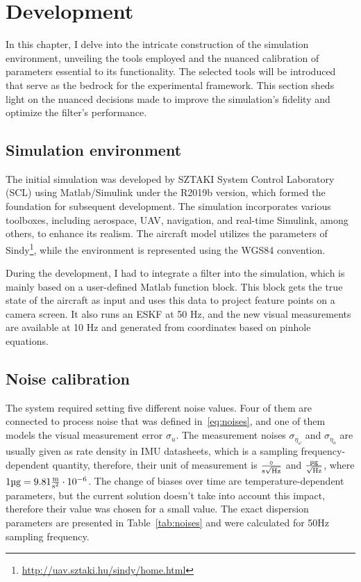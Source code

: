 \chapter{Development}\label{chap:dev}

In this chapter, I delve into the intricate construction of the simulation environment, unveiling the tools employed and the nuanced calibration of parameters essential to its functionality. The selected tools will be introduced that serve as the bedrock for the experimental framework. This section sheds light on the nuanced decisions made to improve the simulation's fidelity and optimize the filter's performance. 

\section{Simulation environment}

The initial simulation was developed by SZTAKI System Control Laboratory (SCL) using Matlab/Simulink under the R2019b version, which formed the foundation for subsequent development. The simulation incorporates various toolboxes, including aerospace, UAV, navigation, and real-time Simulink, among others, to enhance its realism. The aircraft model utilizes the parameters of Sindy\footnote{\url{http://uav.sztaki.hu/sindy/home.html}}, while the environment is represented using the WGS84 convention.

During the development, I had to integrate a filter into the simulation, which is mainly based on a user-defined Matlab function block. This block gets the true state of the aircraft as input and uses this data to project feature points on a camera screen. It also runs an ESKF at 50 \si{\hertz}, and the new visual measurements are available at 10 \si{\hertz} and generated from coordinates based on pinhole equations.

\section{Noise calibration}

The system required setting five different noise values. Four of them are connected to process noise that was defined in~\eqref{eq:noises}, and one of them models the visual measurement error $\sigma_u$. The measurement noises $\sigma_{\eta_\omega}$ and $\sigma_{\eta_a}$ are usually given as rate density in IMU datasheets, which is a sampling frequency-dependent quantity, therefore, their unit of measurement is $\si{\frac{\circ}{\second\sqrt{\hertz}}}$ and $\si{\frac{\micro g}{\sqrt{\hertz}}}$, where $1\si{\micro g}=9.81\si{\frac{\meter}{\second\squared}}\cdot 10^{-6}$. The change of biases over time are temperature-dependent parameters, but the current solution doesn't take into account this impact, therefore their value was chosen for a small value. The exact dispersion parameters are presented in Table~\ref{tab:noises} and were calculated for 50\si{\hertz} sampling frequency.

